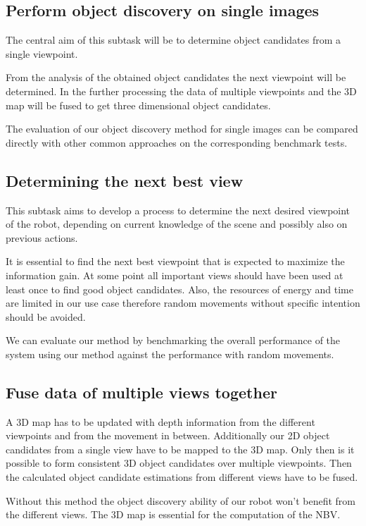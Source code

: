 \documentclass[a4paper,11pt,english]{article}
\begin{document}
\subsection{Perform object discovery on single images}
The central aim of this subtask will be to determine object candidates from a single viewpoint.

From the analysis of the obtained object candidates the next viewpoint will be determined.
In the further processing the data of multiple viewpoints and the 3D map will be fused to get three dimensional object candidates.

The evaluation of our object discovery method for single images can be compared directly with other common approaches on the corresponding benchmark tests.

\subsection{Determining the next best view}
This subtask aims to develop a process to determine the next desired viewpoint of the robot, depending on current knowledge of the scene and possibly also on previous actions.

It is essential to find the next best viewpoint that is expected to maximize the information gain.
At some point all important views should have been used at least once to find good object candidates.
Also, the resources of energy and time are limited in our use case therefore random movements without specific intention should be avoided.

We can evaluate our method by benchmarking the overall performance of the system using our method against the performance with random movements.

\subsection{Fuse data of multiple views together}
A 3D map has to be updated with depth information from the different viewpoints and from the movement in between.
Additionally our 2D object candidates from a single view have to be mapped to the 3D map.
Only then is it possible to form consistent 3D object candidates over multiple viewpoints.
Then the calculated object candidate estimations from different views have to be fused.

Without this method the object discovery ability of our robot won't benefit from the different views.
The 3D map is essential for the computation of the NBV.
\end{document}
